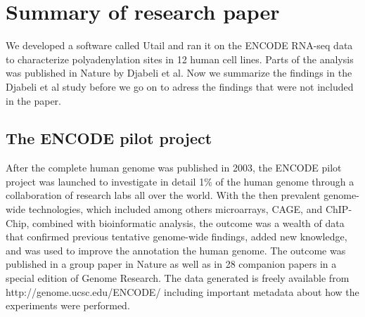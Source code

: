 %








\section{Summary of research paper}
We developed a software called Utail and ran it on the ENCODE RNA-seq data to
characterize polyadenylation sites in 12 human cell lines. Parts of the
analysis was published in Nature by Djabeli et al. Now we summarize the findings in
the Djabeli et al study before we go on to adress the findings that were not
included in the paper.

\subsection{The ENCODE pilot project}
After the complete human genome was published in 2003, the ENCODE pilot project
was launched to investigate in detail 1\% of the human genome through a
collaboration of research labs all over the world. With the then prevalent genome-wide
technologies, which included among others microarrays, CAGE, and ChIP-Chip,
combined with bioinformatic analysis, the outcome was a wealth of data that
confirmed previous tentative genome-wide findings, added new knowledge, and was
used to improve the annotation the human genome. The outcome was published in a
group paper in Nature \cite{birney_identification_2007} as well as in 28
companion papers in a special edition of Genome Research. The data generated
is freely available from http://genome.ucsc.edu/ENCODE/ including important
metadata about how the experiments were performed.

